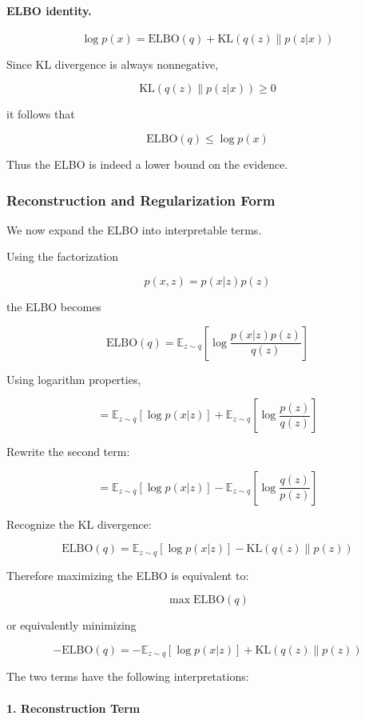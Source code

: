 \documentclass[12pt]{article}
\begin{document}
\paragraph{ELBO identity.}
\[
\log p(x)
=
\mathrm{ELBO}(q)
+
\mathrm{KL}(q(z)\|p(z|x))
\]

Since KL divergence is always nonnegative,

\[
\mathrm{KL}(q(z)\|p(z|x))
\geq 0
\]

it follows that

\[
\mathrm{ELBO}(q)
\leq
\log p(x)
\]

Thus the ELBO is indeed a lower bound on the evidence.

\subsubsection*{Reconstruction and Regularization Form}

We now expand the ELBO into interpretable terms.

Using the factorization

\[
p(x,z)
=
p(x|z)p(z)
\]

the ELBO becomes

\[
\mathrm{ELBO}(q)
=
\mathbb E_{z\sim q}
\left[
\log
\frac{p(x|z)p(z)}{q(z)}
\right]
\]

Using logarithm properties,

\[
=
\mathbb E_{z\sim q}[\log p(x|z)]
+
\mathbb E_{z\sim q}
\left[
\log \frac{p(z)}{q(z)}
\right]
\]

Rewrite the second term:

\[
=
\mathbb E_{z\sim q}[\log p(x|z)]
-
\mathbb E_{z\sim q}
\left[
\log \frac{q(z)}{p(z)}
\right]
\]

Recognize the KL divergence:

\[
\boxed{
\mathrm{ELBO}(q)
=
\mathbb E_{z\sim q}[\log p(x|z)]
-
\mathrm{KL}(q(z)\|p(z))
}
\]

Therefore maximizing the ELBO is equivalent to:

\[
\boxed{
\max \mathrm{ELBO}(q)
}
\]

or equivalently minimizing

\[
\boxed{
-\mathrm{ELBO}(q)
=
-
\mathbb E_{z\sim q}[\log p(x|z)]
+
\mathrm{KL}(q(z)\|p(z))
}
\]

The two terms have the following interpretations:

\paragraph{1. Reconstruction Term}
\end{document}
